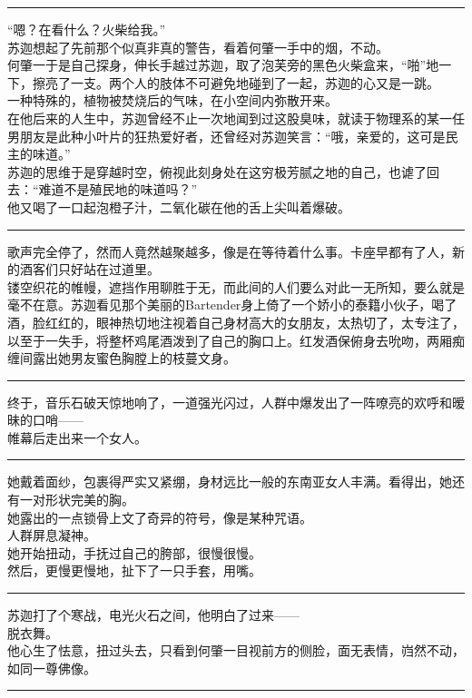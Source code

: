 \documentclass[oneside,11pt]{memoir} %
\begin{document}
\begin{CJK}{UTF8}{gbsn}
\rule{-3pt}{30pt}
    “嗯？在看什么？火柴给我。”\\\indent
    苏迦想起了先前那个似真非真的警告，看着何肇一手中的烟，不动。\\\indent
    何肇一于是自己探身，伸长手越过苏迦，取了泡芙旁的黑色火柴盒来，“啪”地一下，擦亮了一支。两个人的肢体不可避免地碰到了一起，苏迦的心又是一跳。\\\indent
    一种特殊的，植物被焚烧后的气味，在小空间内弥散开来。\\\indent
    在他后来的人生中，苏迦曾经不止一次地闻到过这股臭味，就读于物理系的某一任男朋友是此种小叶片的狂热爱好者，还曾经对苏迦笑言：“哦，亲爱的，这可是民主的味道。”\\\indent
    苏迦的思维于是穿越时空，俯视此刻身处在这穷极芳腻之地的自己，也谑了回去：“难道不是殖民地的味道吗？”\\\indent
    他又喝了一口起泡橙子汁，二氧化碳在他的舌上尖叫着爆破。\\\indent
\rule{-3pt}{30pt}
    歌声完全停了，然而人竟然越聚越多，像是在等待着什么事。卡座早都有了人，新的酒客们只好站在过道里。\\\indent
    镂空织花的帷幔，遮挡作用聊胜于无，而此间的人们要么对此一无所知，要么就是毫不在意。苏迦看见那个美丽的Bartender身上倚了一个娇小的泰籍小伙子，喝了酒，脸红红的，眼神热切地注视着自己身材高大的女朋友，太热切了，太专注了，以至于一失手，将整杯鸡尾酒泼到了自己的胸口上。红发酒保俯身去吮吻，两厢痴缠间露出她男友蜜色胸膛上的枝蔓文身。\\\indent
\rule{-3pt}{30pt}
    终于，音乐石破天惊地响了，一道强光闪过，人群中爆发出了一阵嘹亮的欢呼和暧昧的口哨——\\\indent
    帷幕后走出来一个女人。\\\indent
\rule{-3pt}{30pt}
    她戴着面纱，包裹得严实又紧绷，身材远比一般的东南亚女人丰满。看得出，她还有一对形状完美的胸。\\\indent
    她露出的一点锁骨上文了奇异的符号，像是某种咒语。\\\indent
    人群屏息凝神。\\\indent
    她开始扭动，手抚过自己的胯部，很慢很慢。\\\indent
    然后，更慢更慢地，扯下了一只手套，用嘴。\\\indent
\rule{-3pt}{30pt}
    苏迦打了个寒战，电光火石之间，他明白了过来——\\\indent
    脱衣舞。\\\indent
    他心生了怯意，扭过头去，只看到何肇一目视前方的侧脸，面无表情，岿然不动，如同一尊佛像。\\\indent
\rule{-3pt}{30pt}

\end{CJK}
\end{document}
